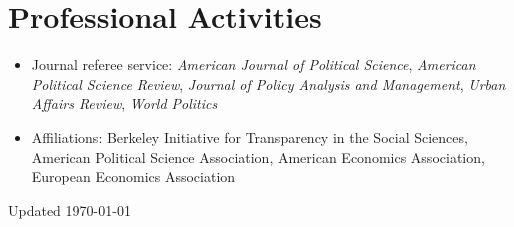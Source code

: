 \documentclass[11pt]{article}
\begin{document}
\vspace{2mm}
\section*{Professional Activities}


\begin{itemize}	

\item[]Journal referee service: \textit{American Journal of Political Science}, \textit{American Political Science Review}, \textit{Journal of Policy Analysis and Management}, \textit{Urban Affairs Review}, \textit{World Politics}
\item[]Affiliations: Berkeley Initiative for Transparency in the Social Sciences, American Political Science Association,  American Economics Association, European Economics Association
\end{itemize}


\vspace*{\fill}

\flushright Updated \today
\end{document}
